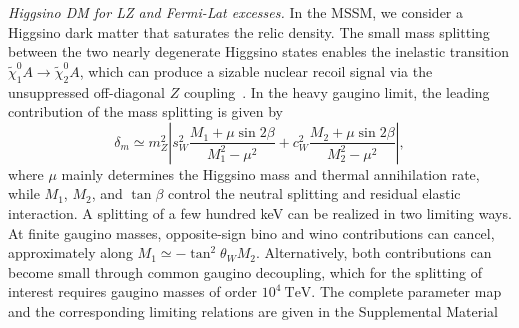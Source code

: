 \documentclass[%
  aps,
  prl,
  reprint,
  superscriptaddress,
  amsmath,
  amssymb,
  longbibliography
]{revtex4-2}
\begin{document}


{\it Higgsino DM for LZ and Fermi-Lat excesses.} In the MSSM, we consider a Higgsino dark matter that saturates the relic density. The small mass splitting between the two nearly degenerate Higgsino states enables the inelastic transition $\widetilde{\chi}_1^0 A \to \widetilde{\chi}_2^0 A$, which can produce a sizable nuclear recoil signal via the unsuppressed off-diagonal $Z$ coupling~\cite{Bramante:2016rdh}. In the heavy gaugino limit, the leading contribution of the mass splitting is given by
\begin{equation}
\delta_m \simeq
m_Z^2
\left|
s_W^2
\frac{M_1+\mu\sin 2\beta}{M_1^2-\mu^2}
+
c_W^2
\frac{M_2+\mu\sin 2\beta}{M_2^2-\mu^2}
\right|,
\label{eq:higgsino_splitting}
\end{equation}
where $\mu$ mainly determines the Higgsino mass and
thermal annihilation rate, while \(M_1\), \(M_2\), and
\(\tan\beta\) control the neutral splitting and residual elastic
interaction. A splitting of a few hundred keV can be realized in
two limiting ways. At finite gaugino masses, opposite-sign bino
and wino contributions can cancel, approximately along
\(M_1\simeq-\tan^2\theta_W M_2\). Alternatively, both
contributions can become small through common gaugino decoupling,
which for the splitting of interest requires gaugino masses of
order \(10^4~\mathrm{TeV}\). The complete parameter map and the corresponding limiting
relations are given in the Supplemental Material

\end{document}
